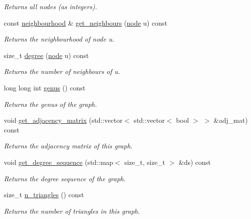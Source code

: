 \begin{DoxyCompactItemize}
\begin{DoxyCompactList}\small\item\em Returns all nodes (as integers). \end{DoxyCompactList}\item 
const \hyperlink{namespacelgraph_a052e7766c13f3a43cec0aec8173fdede}{neighbourhood} \& \hyperlink{classlgraph_1_1xxgraph_a8b6d2d8126d39fc4167e9b93af78d5fc}{get\-\_\-neighbours} (\hyperlink{namespacelgraph_a397169dd66adf725210a30fb7251773e}{node} u) const 
\begin{DoxyCompactList}\small\item\em Returns the neighbourhood of node u. \end{DoxyCompactList}\item 
size\-\_\-t \hyperlink{classlgraph_1_1xxgraph_a3106eaa7cc937f414c2281e542264883}{degree} (\hyperlink{namespacelgraph_a397169dd66adf725210a30fb7251773e}{node} u) const 
\begin{DoxyCompactList}\small\item\em Returns the number of neighbours of u. \end{DoxyCompactList}\item 
long long int \hyperlink{classlgraph_1_1xxgraph_ae758b0403a8a1d9b82a8859608f4049c}{genus} () const 
\begin{DoxyCompactList}\small\item\em Returns the genus of the graph. \end{DoxyCompactList}\item 
\hypertarget{classlgraph_1_1xxgraph_a4161a548022795a068af53c76d504391}{void \hyperlink{classlgraph_1_1xxgraph_a4161a548022795a068af53c76d504391}{get\-\_\-adjacency\-\_\-matrix} (std\-::vector$<$ std\-::vector$<$ bool $>$ $>$ \&adj\-\_\-mat) const }\label{classlgraph_1_1xxgraph_a4161a548022795a068af53c76d504391}

\begin{DoxyCompactList}\small\item\em Returns the adjacency matrix of this graph. \end{DoxyCompactList}\item 
void \hyperlink{classlgraph_1_1xxgraph_ad83dc5e5687dd334b56af426adbbd04b}{get\-\_\-degree\-\_\-sequence} (std\-::map$<$ size\-\_\-t, size\-\_\-t $>$ \&ds) const 
\begin{DoxyCompactList}\small\item\em Returns the degree sequence of the graph. \end{DoxyCompactList}\item 
size\-\_\-t \hyperlink{classlgraph_1_1xxgraph_a6aa54c191500b3fc952ec0d5e897dc1a}{n\-\_\-triangles} () const 
\begin{DoxyCompactList}\small\item\em Returns the number of triangles in this graph. \end{DoxyCompactList}\end{DoxyCompactItemize}
